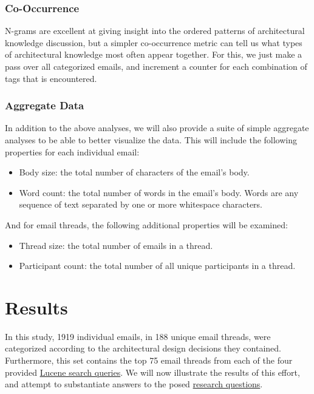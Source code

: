\documentclass[a4paper, 12pt]{article}
\begin{document}
		\subsubsection{Co-Occurrence}
			N-grams are excellent at giving insight into the ordered patterns of architectural knowledge discussion, but a simpler co-occurrence metric can tell us what types of architectural knowledge most often appear together. For this, we just make a pass over all categorized emails, and increment a counter for each combination of tags that is encountered.
			
		\subsubsection{Aggregate Data}
			In addition to the above analyses, we will also provide a suite of simple aggregate analyses to be able to better visualize the data. This will include the following properties for each individual email:
			
			\begin{itemize}
				\item Body size: the total number of characters of the email's body.
				\item Word count: the total number of words in the email's body. Words are any sequence of text separated by one or more whitespace characters.
			\end{itemize}
		
			And for email threads, the following additional properties will be examined:
			
			\begin{itemize}
				\item Thread size: the total number of emails in a thread.
				\item Participant count: the total number of all unique participants in a thread.
			\end{itemize}

\section{Results}
	In this study, 1919 individual emails, in 188 unique email threads, were categorized according to the architectural design decisions they contained. Furthermore, this set contains the top 75 email threads from each of the four provided \hyperref[sec:queries]{Lucene search queries}. We will now illustrate the results of this effort, and attempt to substantiate answers to the posed \hyperref[sec:research-questions]{research questions}.
	
\end{document}
